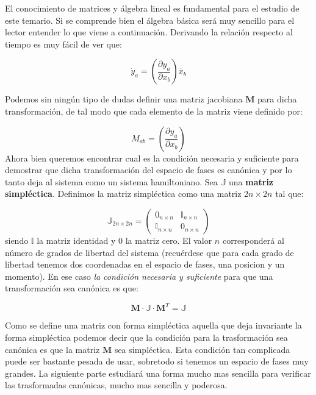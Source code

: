 \documentclass[12pt,a4paper]{article}
\numberwithin{equation}{section}
\numberwithin{figure}{section}
\newcommand{\parentesis}[1]{\left( #1  \right)}
\newcommand{\parciales}[2]{\frac{\partial #1}{\partial #2}}
\newcommand{\Mn}{\mathbf{M}}
\begin{document}
El conocimiento de matrices y álgebra lineal es fundamental para el estudio de este temario. Si se comprende bien el álgebra básica será muy sencillo para el lector entender lo que viene a continuación. Derivando la relación respecto al tiempo es muy fácil de ver que:

\begin{equation}
\dot{y}_a = \parentesis{\parciales{y_a}{x_b}} \dot{x_b}
\end{equation}

Podemos sin ningún tipo de dudas definir una matriz jacobiana $\Mn$ para dicha transformación, de tal modo que cada elemento de la matriz viene definido por:

\begin{equation}
M_{ab} =  \parentesis{\parciales{y_a}{x_b}} 
\end{equation}
Ahora bien queremos encontrar cual es la condición necesaria y suficiente para demostrar que dicha transformación del espacio de fases es canónica y por lo tanto deja al sistema como un sistema hamiltoniano. Sea $\mathbb{J}$ una \textbf{matriz simpléctica}. Definimos la matriz simpléctica como una matriz $2n \times 2n $ tal que:

\begin{equation}
\mathbb{J}_{2n \times 2n} = \begin{pmatrix}
0_{n \times n} & \mathbb{I}_{n \times n} \\
\mathbb{I}_{n \times n} & 0_{n \times n}
\end{pmatrix}
\end{equation}
siendo $\mathbb{I}$ la matriz identidad y $0$ la matriz cero. El valor $n$ corresponderá al número de grados de libertad del sistema (recuérdese que para cada grado de libertad tenemos dos coordenadas en el espacio de fases, una posicion y un momento). En ese caso \textit{la condición necesaria y suficiente} para que una transformación sea canónica es que:

\begin{equation}
\Mn \cdot \mathbb{J} \cdot \Mn^T = \mathbb{J}
\end{equation}

Como se define una matriz con forma simpléctica aquella que deja invariante la forma simpléctica podemos decir que la condición para la trasformación sea canónica es que la matriz $\Mn$ sea simpléctica. Esta condición tan complicada puede ser bastante pesada de usar, sobretodo si tenemos un espacio de fases muy grandes. La siguiente parte estudiará una forma mucho mas sencilla para verificar las trasformadas canónicas, mucho mas sencilla y poderosa.
\end{document}
